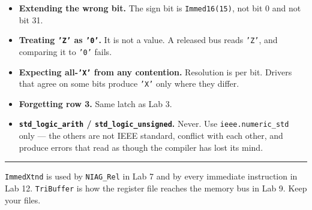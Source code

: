 \documentclass[11pt]{article}
\newcommand{\code}[1]{\texttt{#1}}
\newcommand{\hr}{\vspace{2pt}\hrule\vspace{6pt}}
\begin{document}
\begin{itemize}[leftmargin=1.6em,itemsep=1pt]
\item \textbf{Extending the wrong bit.} The sign bit is \code{Immed16(15)}, not
bit 0 and not bit 31.
\item \textbf{Treating \code{'Z'} as \code{'0'}.} It is not a value. A released
bus reads \code{'Z'}, and comparing it to \code{'0'} fails.
\item \textbf{Expecting all-\code{'X'} from any contention.} Resolution is per
bit. Drivers that agree on some bits produce \code{'X'} only where they differ.
\item \textbf{Forgetting row 3.} Same latch as Lab 3.
\item \textbf{\code{std\_logic\_arith} / \code{std\_logic\_unsigned}.} Never.
Use \code{ieee.numeric\_std} only --- the others are not IEEE standard, conflict
with each other, and produce errors that read as though the compiler has lost its
mind.
\end{itemize}

\vspace{10pt}
\hr
{\small \code{ImmedXtnd} is used by \code{NIAG\_Rel} in Lab 7 and by every
immediate instruction in Lab 12. \code{TriBuffer} is how the register file
reaches the memory bus in Lab 9. Keep your files.}
\end{document}
